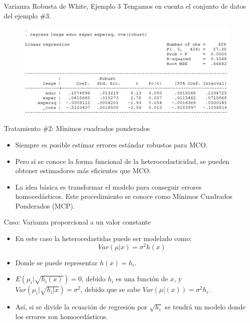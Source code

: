 \begin{frame}{Varianza Robusta de White, Ejemplo 3}
	Tengamos en cuenta el conjunto de datos del ejemplo \#3.
		\begin{figure}
			\centering
			\includegraphics[scale=.30]{fig/white3.png}
		\end{figure}
\end{frame}
\begin{frame}{Tratamiento \#2: Mínimos cuadrados ponderados}
	\begin{itemize}
		\item Siempre es posible estimar errores estándar robustos para MCO.
		\item Pero si se conoce la forma funcional de la heterocedasticidad, se pueden obtener estimadores más eficientes que MCO.
		\item La idea básica es transformar el modelo para conseguir errores homocedásticos. Este procedimiento se conoce como Mínimos Cuadrados Ponderados (MCP).
	\end{itemize}
\end{frame}
\begin{frame}{Caso: Varianza proporcional a un valor constante}
	\begin{itemize}
		\item En este caso la heterocedastidas puede ser modelado como:
				$$Var(\mu | x)=\sigma^2h(x)$$
		\item Donde se puede representar $h(x)=h_i$.
		\item $E(\mu_i | \sqrt{h_i(x)})=0$, debido $h_i$ es una función de $x$, y $Var(\mu_i | \sqrt{h_i|x})=\sigma^2$, debido que se sabe $Var(\mu | (x))=\sigma^2 h_i$.
		\item Así, si se divide la ecuación de regresión por $\sqrt{h_i}$ se tendrá un modelo donde los errores son homocedásticos.
	\end{itemize}
\end{frame}
